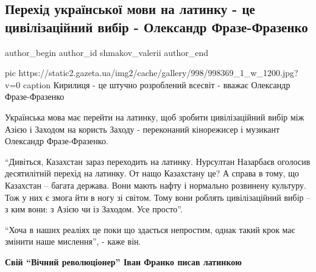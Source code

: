  
 
 
 
 
 
\subsection{Перехід української мови на латинку - це цивілізаційний вибір - Олександр Фразе-Фразенко}
\label{sec:03_12_2020.news.ua.gazeta.shmakov_valerii.1.franko_kirillica}
\ifcmt
	author_begin
   author_id shmakov_valerii
	author_end
\fi

\ifcmt
pic https://static2.gazeta.ua/img2/cache/gallery/998/998369_1_w_1200.jpg?v=0
caption Кирилиця - це штучно розроблений всесвіт - вважає Олександр Фразе-Фразенко 
\fi

Українська мова має перейти на латинку, щоб зробити цивілізаційний вибір між
Азією і Заходом на користь Заходу - переконаний кінорежисер і музикант
Олександр Фразе-Фразенко.

\enquote{Дивіться, Казахстан зараз переходить на латинку. Нурсултан Назарбаєв оголосив
десятилітній перехід на латинку. От нащо Казахстану це? А справа в тому, що
Казахстан – багата держава. Вони мають нафту і нормально розвинену культуру.
Тож у них є змога йти в ногу зі світом. Тому вони роблять цивілізаційний вибір
– з ким вони: з Азією чи із Заходом. Усе просто}.

\enquote{Хоча в наших реаліях це поки що здається непростим, однак такий крок має
змінити наше мислення}, - каже він.

\begin{leftbar}
	\bfseries
Свій \enquote{Вічний революціонер} Іван Франко писав латинкою
\end{leftbar}

